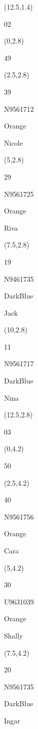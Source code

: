 \documentclass[a4paper]{article}
\newcommand{\myseat}[4]{%
\vspace{-0.1cm}
\parbox[t][2.2cm][t]{3.5cm}{
\small #1 %
\begin{description}
\vspace{-0.1cm}
\item [ID:] #2
\vspace{-0.1cm}
\item [Team:] #3 \normalsize
\vspace{-0.1cm}
\item \normalsize #4
\vspace{-0.1cm}
\end{description}
}
}
\begin{document}
\begin{CJK}{UTF8}{cyberbit}
\begin{textblock}{2.5}(12.5,1.4)
\textblockcolor{}
	\myseat{02}{}{}{}
\end{textblock}

\begin{textblock}{2.5}(0,2.8)
\textblockcolor{}
	\myseat{49}{}{}{}
\end{textblock}

\begin{textblock}{2.5}(2.5,2.8)
	\myseat{39}{N9561712}{Orange}{Nicole}
\end{textblock}

\begin{textblock}{2.5}(5,2.8)
	\myseat{29}{N9561725}{Orange}{Riva}
\end{textblock}

\begin{textblock}{2.5}(7.5,2.8)
	\myseat{19}{N9461735}{DarkBlue}{Jack}
\end{textblock}

\begin{textblock}{2.5}(10,2.8)
	\myseat{11}{N9561717}{DarkBlue}{Nina}
\end{textblock}

\begin{textblock}{2.5}(12.5,2.8)
\textblockcolor{}
	\myseat{03}{}{}{}
\end{textblock}

\begin{textblock}{2.5}(0,4.2)
\textblockcolor{}
	\myseat{50}{}{}{}
\end{textblock}

\begin{textblock}{2.5}(2.5,4.2)
	\myseat{40}{N9561756}{Orange}{Cara}
\end{textblock}

\begin{textblock}{2.5}(5,4.2)
	\myseat{30}{U9631039}{Orange}{Shally}
\end{textblock}

\begin{textblock}{2.5}(7.5,4.2)
	\myseat{20}{N9561735}{DarkBlue}{Ingar}
\end{textblock}


\end{CJK}
\end{document}

